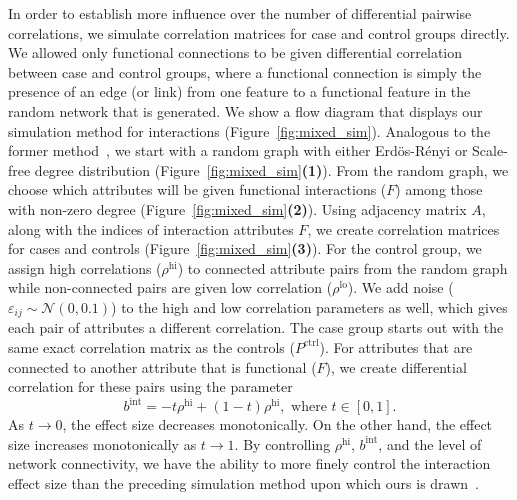 \documentclass[10pt,letterpaper]{article}
\begin{document}
In order to establish more influence over the number of differential pairwise correlations, we simulate correlation matrices for case and control groups directly. We allowed only functional connections to be given differential correlation between case and control groups, where a functional connection is simply the presence of an edge (or link) from one feature to a functional feature in the random network that is generated. We show a flow diagram that displays our simulation method for interactions (Figure~\ref{fig:mixed_sim}). Analogous to the former method~\cite{lareau15}, we start with a random graph with either Erd\"{o}s-R\'{e}nyi or Scale-free degree distribution (Figure~\ref{fig:mixed_sim}\textbf{(1)}). From the random graph, we choose which attributes will be given functional interactions ($F$) among those with non-zero degree (Figure~\ref{fig:mixed_sim}\textbf{(2)}). Using adjacency matrix $A$, along with the indices of interaction attributes $F$, we create correlation matrices for cases and controls (Figure~\ref{fig:mixed_sim}\textbf{(3)}). For the control group, we assign high correlations ($\rho^\text{hi}$) to connected attribute pairs from the random graph while non-connected pairs are given low correlation ($\rho^\text{lo}$). We add noise ($\varepsilon_{ij} \sim \mathcal{N}(0,0.1)$) to the high and low correlation parameters as well, which gives each pair of attributes a different correlation. The case group starts out with the same exact correlation matrix as the controls ($P^\text{ctrl}$). For attributes that are connected to another attribute that is functional ($F$), we create differential correlation for these pairs using the parameter
\begin{equation}\label{eq:b_int}
b^\text{int} = - t \rho^\text{hi} + (1 - t) \rho^\text{hi}, \text{ where } t \in [0,1].
\end{equation}
As $t \to 0$, the effect size decreases monotonically. On the other hand, the effect size increases monotonically as $t \to 1$. By controlling $\rho^\text{hi}$, $b^\text{int}$, and the level of network connectivity, we have the ability to more finely control the interaction effect size than the preceding simulation method upon which ours is drawn~\cite{lareau15}. 
\end{document}
